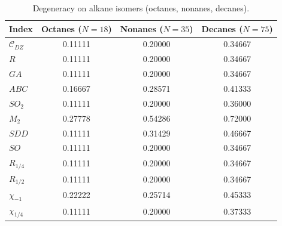 \documentclass[11pt,a4paper]{article}
\theoremstyle{plain}
\theoremstyle{definition}
\theoremstyle{remark}
\newcommand{\CDZ}{\mathcal{C}_{DZ}}
\begin{document}
\begin{table}[htbp]
\centering
\caption{Degeneracy on alkane isomers (octanes, nonanes, decanes).}
\label{tab:degeneracy-alkanes}
\begin{tabular}{lccc}
\toprule
Index & Octanes ($N=18$) & Nonanes ($N=35$) & Decanes ($N=75$) \\
\midrule
$\CDZ$       & 0.11111 & 0.20000 & 0.34667 \\
$R$          & 0.11111 & 0.20000 & 0.34667 \\
$GA$         & 0.11111 & 0.20000 & 0.34667 \\
$ABC$        & 0.16667 & 0.28571 & 0.41333 \\
$SO_2$       & 0.11111 & 0.20000 & 0.36000 \\
$M_2$        & 0.27778 & 0.54286 & 0.72000 \\
$SDD$        & 0.11111 & 0.31429 & 0.46667 \\
$SO$         & 0.11111 & 0.20000 & 0.34667 \\
$R_{1/4}$    & 0.11111 & 0.20000 & 0.34667 \\
$R_{1/2}$    & 0.11111 & 0.20000 & 0.34667 \\
$\chi_{-1}$  & 0.22222 & 0.25714 & 0.45333 \\
$\chi_{1/4}$ & 0.11111 & 0.20000 & 0.37333 \\
\bottomrule
\end{tabular}
\end{table}
\end{document}
